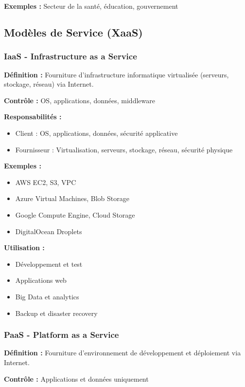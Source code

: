 \documentclass[11pt,a4paper]{article}
\begin{document}
\textbf{Exemples :} Secteur de la santé, éducation, gouvernement

\subsection{Modèles de Service (XaaS)}

\subsubsection{IaaS - Infrastructure as a Service}

\textbf{Définition :} Fourniture d'infrastructure informatique virtualisée (serveurs, stockage, réseau) via Internet.

\textbf{Contrôle :} OS, applications, données, middleware

\textbf{Responsabilités :}
\begin{itemize}
    \item Client : OS, applications, données, sécurité applicative
    \item Fournisseur : Virtualisation, serveurs, stockage, réseau, sécurité physique
\end{itemize}

\textbf{Exemples :}
\begin{itemize}
    \item AWS EC2, S3, VPC
    \item Azure Virtual Machines, Blob Storage
    \item Google Compute Engine, Cloud Storage
    \item DigitalOcean Droplets
\end{itemize}

\textbf{Utilisation :}
\begin{itemize}
    \item Développement et test
    \item Applications web
    \item Big Data et analytics
    \item Backup et disaster recovery
\end{itemize}

\subsubsection{PaaS - Platform as a Service}

\textbf{Définition :} Fourniture d'environnement de développement et déploiement via Internet.

\textbf{Contrôle :} Applications et données uniquement
\end{document}
